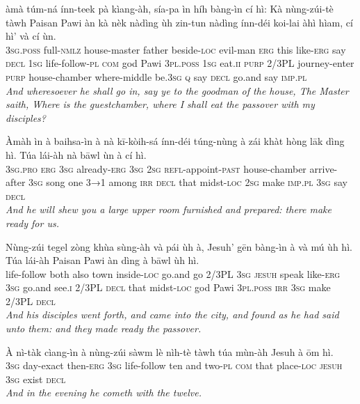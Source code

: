 \documentclass[11pt,a4paper]{article}
\begin{document}
\begin{exe}
\gll àmà túm-ná ínn-teek pà kìang-àh, sía-pa ìn híh bàng-ìn cí hì: Kà nùng-zúi-tè tàwh Paisan Pawi àn kà nèk nàdìng ùh zin-tun nàdìng ínn-déi koi-lai àhì hìam, cí hì' và cí ùn. \\
     \textsc{3sg}.\textsc{poss} full-\textsc{nmlz} house-master father beside-\textsc{loc} evil-man \textsc{erg} this like-\textsc{erg} say \textsc{decl} \textsc{1sg} life-follow-\textsc{pl} \textsc{com} god Pawi \textsc{3pl}.\textsc{poss} \textsc{1sg} eat.\textsc{ii} \textsc{purp} 2/3PL journey-enter \textsc{purp} house-chamber where-middle be.\textsc{3sg} \textsc{q} say \textsc{decl} go.and say \textsc{imp}.\textsc{pl} \\
\glt \textcolor{kjvcolor}{\textit{And wheresoever he shall go in, say ye to the goodman of the house, The Master saith, Where is the guestchamber, where I shall eat the passover with my disciples?}}

\gll Àmàh ìn à baihsa-ìn à nà kī-kòih-sá ínn-déi túng-nùng à zái khàt hòng lāk dìng hì. Túa lái-àh nà bāwl ùn à cí hì. \\
     \textsc{3sg}.\textsc{pro} \textsc{erg} \textsc{3sg} already-\textsc{erg} \textsc{3sg} \textsc{2sg} \textsc{refl}-appoint-\textsc{past} house-chamber arrive-after \textsc{3sg} song one \textsc{3→1} among \textsc{irr} \textsc{decl} that midst-\textsc{loc} \textsc{2sg} make \textsc{imp}.\textsc{pl} \textsc{3sg} say \textsc{decl} \\
\glt \textcolor{kjvcolor}{\textit{And he will shew you a large upper room furnished and prepared: there make ready for us.}}

\gll Nùng-zúi tegel zòng khùa sùng-àh và pái ùh à, Jesuh' gēn bàng-ìn à và mú ùh hì. Túa lái-àh Paisan Pawi àn dìng à bāwl ùh hì. \\
     life-follow both also town inside-\textsc{loc} go.and go 2/3PL \textsc{3sg} \textsc{jesuh} speak like-\textsc{erg} \textsc{3sg} go.and see.\textsc{i} 2/3PL \textsc{decl} that midst-\textsc{loc} god Pawi \textsc{3pl}.\textsc{poss} \textsc{irr} \textsc{3sg} make 2/3PL \textsc{decl} \\
\glt \textcolor{kjvcolor}{\textit{And his disciples went forth, and came into the city, and found as he had said unto them: and they made ready the passover.}}

\gll À nì-tàk cìang-ìn à nùng-zúi sàwm lè nìh-tè tàwh túa mùn-àh Jesuh à ōm hì. \\
     \textsc{3sg} day-exact then-\textsc{erg} \textsc{3sg} life-follow ten and two-\textsc{pl} \textsc{com} that place-\textsc{loc} \textsc{jesuh} \textsc{3sg} exist \textsc{decl} \\
\glt \textcolor{kjvcolor}{\textit{And in the evening he cometh with the twelve.}}


\end{exe}
\end{document}

